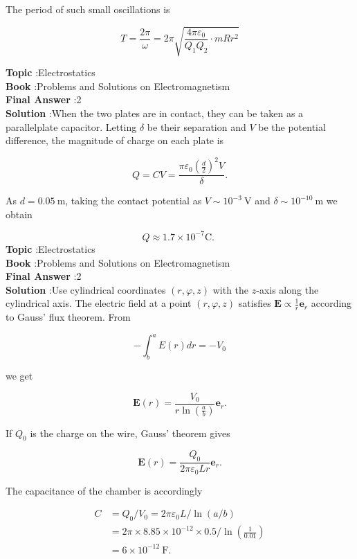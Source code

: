 \documentclass[10pt]{article}
\begin{document}
The period of such small oscillations is

$$
T=\frac{2 \pi}{\omega}=2 \pi \sqrt{\frac{4 \pi \varepsilon_{0}}{Q_{1} Q_{2}} \cdot m R r^{2}}
$$


\textbf{Topic} :Electrostatics\\
\textbf{Book} :Problems and Solutions on Electromagnetism\\
\textbf{Final Answer} :2 \pi {}\\


\textbf{Solution} :When the two plates are in contact, they can be taken as a parallelplate capacitor. Letting $\delta$ be their separation and $V$ be the potential difference, the magnitude of charge on each plate is

$$
Q=C V=\frac{\pi \varepsilon_{0}\left(\frac{d}{2}\right)^{2} V}{\delta} .
$$

As $d=0.05 \mathrm{~m}$, taking the contact potential as $V \sim 10^{-3} \mathrm{~V}$ and $\delta \sim 10^{-10} \mathrm{~m}$ we obtain

$$
Q \approx 1.7 \times 10^{-7} \mathrm{C} \text {. }
$$
\textbf{Topic} :Electrostatics\\
\textbf{Book} :Problems and Solutions on Electromagnetism\\
\textbf{Final Answer} :2 \pi {}\\


\textbf{Solution} :Use cylindrical coordinates $(r, \varphi, z)$ with the $z$-axis along the cylindrical axis. The electric field at a point $(r, \varphi, z)$ satisfies $\mathbf{E} \propto \frac{1}{r} \mathbf{e}_{r}$ according to Gauss' flux theorem. From

$$
-\int_{b}^{a} E(r) d r=-V_{0}
$$

we get

$$
\mathbf{E}(r)=\frac{V_{0}}{r \ln \left(\frac{a}{b}\right)} \mathbf{e}_{r} .
$$

If $Q_{0}$ is the charge on the wire, Gauss' theorem gives

$$
\mathbf{E}(r)=\frac{Q_{0}}{2 \pi \varepsilon_{0} L r} \mathbf{e}_{r} .
$$

The capacitance of the chamber is accordingly

$$
\begin{aligned}
C &=Q_{0} / V_{0}=2 \pi \varepsilon_{0} L / \ln (a / b) \\
&=2 \pi \times 8.85 \times 10^{-12} \times 0.5 / \ln \left(\frac{1}{0.01}\right) \\
&=6 \times 10^{-12} \mathrm{~F} .
\end{aligned}
$$
\end{document}
